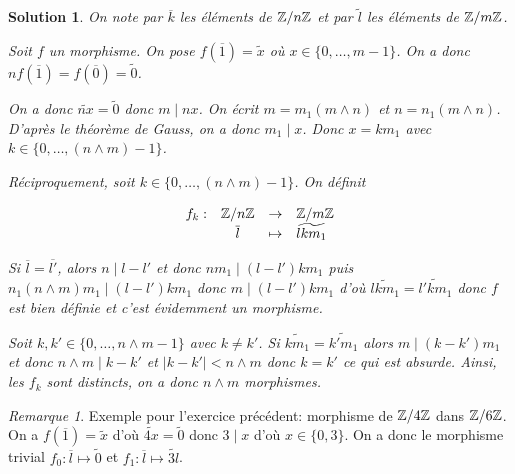 \documentclass[12pt]{article}
\newtheorem{solution}{Solution}[section]
\theoremstyle{remark}
\newtheorem{remark}{Remarque}[section]
\newcommand{\function}[5]{
	$$
	\begin{array}{rccl}
		#1: & #2 & \to & #3 \\
		& #4 & \mapsto & #5
	\end{array}
	$$
}
\numberwithin{equation}{section}
\begin{document}
\begin{solution}
	On note par $\overline{k}$ les éléments de $\mathbb{Z}/n\mathbb{Z}$ et par $\widetilde{l}$ les éléments de $\mathbb{Z}/m\mathbb{Z}$.

	Soit $f$ un morphisme. On pose $f(\overline{1})=\widetilde{x}$ où $x\in\{0,\dots,m-1\}$. On a donc $nf(\overline{1})=f(\overline{0})=\widetilde{0}$.

	On a donc $\widetilde{nx}=\widetilde{0}$ donc $m\mid nx$. On écrit $m=m_{1}(m\wedge n)$ et $n=n_{1}(m\wedge n)$. D'après le théorème de Gauss, on a donc $m_{1}\mid x$. Donc $x=km_{1}$ avec $k\in\{0,\dots,(n\wedge m)-1\}$.

	Réciproquement, soit $k\in\{0,\dots,(n\wedge m)-1\}$. On définit 
	\function{f_k}{\Z/n\Z}{\Z/m\Z}{\overline{l}}{\widetilde{lkm_{1}}}
	Si $\overline{l}=\overline{l'}$, alors $n\mid l-l'$ et donc $nm_{1}\mid (l-l')km_{1}$ puis $n_{1}(n\wedge m)m_{1}\mid (l-l')km_{1}$ donc $m\mid (l-l')km_{1}$ d'où $\widetilde{lkm_{1}}=\widetilde{l'km_{1}}$ donc $f$ est bien définie et c'est évidemment un morphisme. 
	
	Soit $k,k'\in\{0,\dots,n\wedge m-1\}$ avec $k\neq k'$. Si $\widetilde{km_{1}}=\widetilde{k'm_{1}}$ alors $m\mid (k-k')m_{1}$ et donc $n\wedge m\mid k-k'$ et $\vert k-k'\vert< n\wedge m$ donc $k=k'$ ce qui est absurde. Ainsi, les $f_{k}$ sont distincts, on a donc $n\wedge m$ morphismes.
\end{solution}

\begin{remark}
	Exemple pour l'exercice précédent: morphisme de $\mathbb{Z}/4\mathbb{Z}$ dans $\mathbb{Z}/6\mathbb{Z}$. On a $f(\overline{1})=\widetilde{x}$ d'où $\widetilde{4x}=\widetilde{0}$ donc $3\mid x$ d'où $x\in\{0,3\}$. On a donc le morphisme trivial $f_{0}\colon \overline{l}\mapsto\widetilde{0}$ et $f_{1}\colon\overline{l}\mapsto\widetilde{3l}$.
\end{remark}
\end{document}
